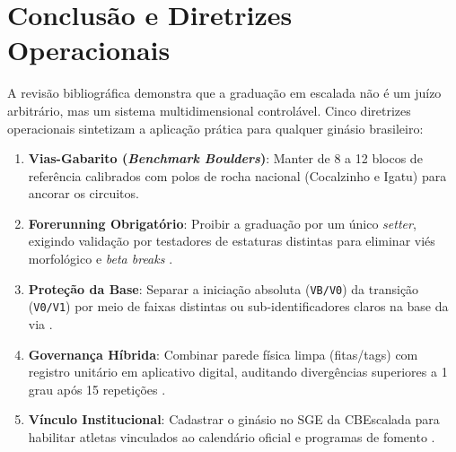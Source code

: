 \section*{Conclusão e Diretrizes Operacionais}

A revisão bibliográfica demonstra que a graduação em escalada não é um juízo arbitrário, mas um sistema multidimensional controlável. Cinco diretrizes operacionais sintetizam a aplicação prática para qualquer ginásio brasileiro:

\begin{enumerate}
    \item \textbf{Vias-Gabarito (\textit{Benchmark Boulders})}: Manter de 8 a 12 blocos de referência calibrados com polos de rocha nacional (Cocalzinho e Igatu) para ancorar os circuitos.
    \item \textbf{Forerunning Obrigatório}: Proibir a graduação por um único \textit{setter}, exigindo validação por testadores de estaturas distintas para eliminar viés morfológico e \textit{beta breaks} \cite{cwa_setting, anderson_routesetting}.
    \item \textbf{Proteção da Base}: Separar a iniciação absoluta (\texttt{VB/V0}) da transição (\texttt{V0/V1}) por meio de faixas distintas ou sub-identificadores claros na base da via \cite{ircra_draper, cwa_setting}.
    \item \textbf{Governança Híbrida}: Combinar parede física limpa (fitas/tags) com registro unitário em aplicativo digital, auditando divergências superiores a 1 grau após 15 repetições \cite{topclimbing_platform, pmc_ric_study}.
    \item \textbf{Vínculo Institucional}: Cadastrar o ginásio no SGE da CBEscalada para habilitar atletas vinculados ao calendário oficial e programas de fomento \cite{cbescalada_filiacoes}.
\end{enumerate}
